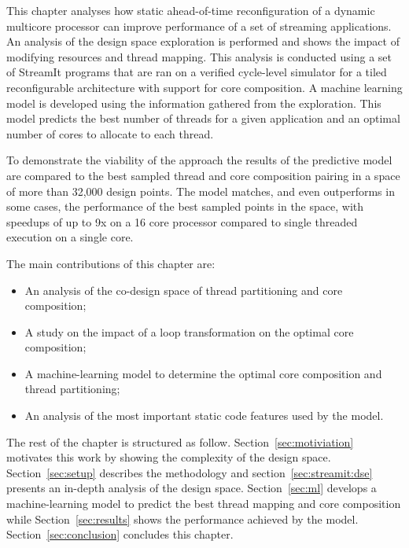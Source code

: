 This chapter analyses how static ahead-of-time reconfiguration of a dynamic multicore processor can improve performance of a set of streaming applications.
An analysis of the design space exploration is performed and shows the impact of modifying resources and thread mapping.
This analysis is conducted using a set of StreamIt programs that are ran on a verified cycle-level simulator for a tiled reconfigurable architecture with support for core composition.
A machine learning model is developed using the information gathered from the exploration.
This model predicts the best number of threads for a given application and an optimal number of cores to allocate to each thread.

To demonstrate the viability of the approach the results of the predictive model are compared to the best sampled thread and core composition pairing in a space of more than 32,000 design points.
The model matches, and even outperforms in some cases, the performance of the best sampled points in the space, with speedups of up to 9x on a 16 core processor compared to single threaded execution on a single core. 

The main contributions of this chapter are:
\begin{itemize}
\item An analysis of the co-design space of thread partitioning and core composition;
\vspace{-1em}
\item A study on the impact of a loop transformation on the optimal core composition;
\vspace{-1em}
\item A machine-learning model to determine the optimal core composition and thread partitioning;
\vspace{-1em}
\item An analysis of the most important static code features used by the model.
\end{itemize}


The rest of the chapter is structured as follow.
Section~\ref{sec:motiviation} motivates this work by showing the complexity of the design space.
Section~\ref{sec:setup} describes the methodology and section~\ref{sec:streamit:dse} presents an in-depth analysis of the design space.
Section~\ref{sec:ml} develops a machine-learning model to predict the best thread mapping and core composition while Section~\ref{sec:results} shows the performance achieved by the model.
Section~\ref{sec:conclusion} concludes this chapter.

